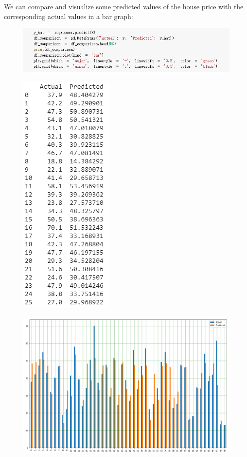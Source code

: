 \documentclass{article}
\begin{document}
We can compare and visualize some predicted values of the house price with the corresponding actual values in a bar graph:
\begin{figure}[H]\includegraphics[width=\linewidth]{16}\end{figure}
\vspace*{-2cm}
\begin{figure}[H]\includegraphics[width=0.25\linewidth]{17}\end{figure}
\begin{figure}[H]\includegraphics[width=\linewidth]{18}\end{figure}
\end{document}
